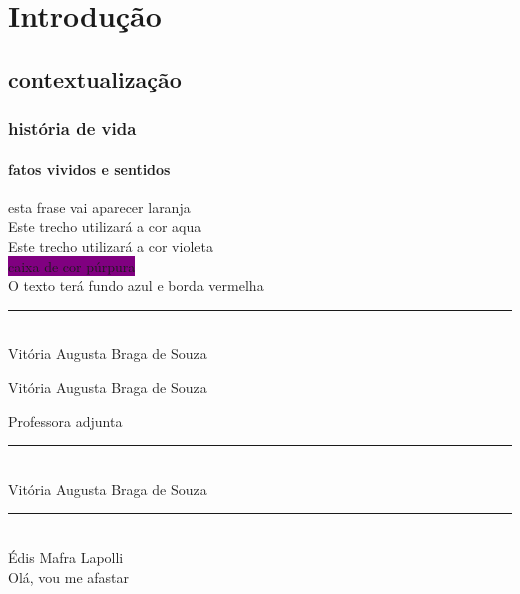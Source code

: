 \documentclass[12pt, a4paper, oneside]{book}
\begin{document}
\chapter{Introdução}

\section{contextualização}

\subsection{história de vida} 

\subsubsection{fatos vividos e sentidos}

\textcolor {laranja} {esta frase vai aparecer laranja}\\

{\color{Aqua} {Este trecho utilizará a cor aqua}}\\
{\color{Violet} {Este trecho utilizará a cor violeta}}\\

\colorbox{Purple} {caixa de cor púrpura}\\
 {O texto terá fundo azul e borda vermelha}\\

\newpage

\begin{center}
\rule{10cm} {0.02cm}\\
Vitória Augusta Braga de Souza
\end{center}

Vitória Augusta Braga de Souza

\hrulefill

Professora  adjunta\\

\begin{center}
\rule{10cm} {0.04cm}\\
Vitória Augusta Braga de Souza

\vspace{2.0cm}

\rule{10cm} {0.02cm}\\
Édis Mafra Lapolli\\

Olá,  \hspace{5cm}  vou me afastar
\end{center}


\end{document}
